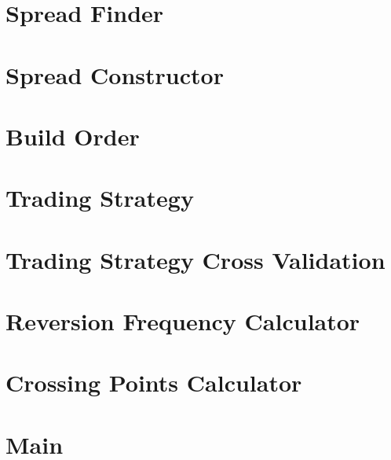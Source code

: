 \documentclass[11pt,a4,twosided,singlespacing,titlepagenumber=on]{scrreprt}
\numberwithin{equation}{chapter} %
\theoremstyle{remark}
\begin{document}
\section{Spread Finder}


\section{Spread Constructor}


\section{Build Order}


\section{Trading Strategy}


\section{Trading Strategy Cross Validation}


\section{Reversion Frequency Calculator}


\section{Crossing Points Calculator}


\section{Main}

\end{document}
